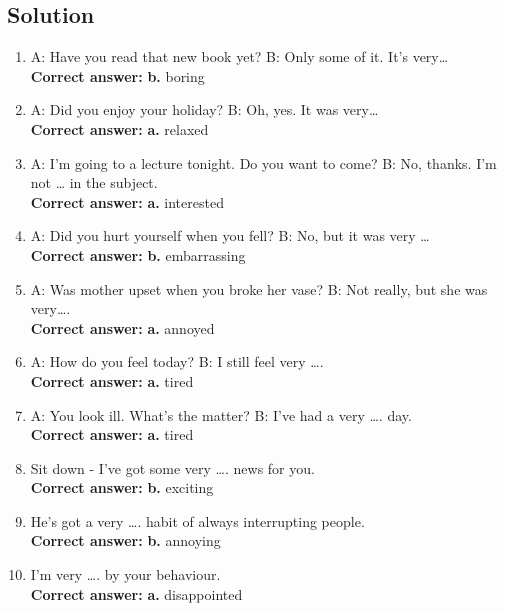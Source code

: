 \subsection*{Solution}
\begin{enumerate}
      \item A: Have you read that new book yet? B: Only some of it. It’s very…\\
            \textbf{Correct answer:} \textbf{b.} boring

      \item A: Did you enjoy your holiday? B: Oh, yes. It was very…\\
            \textbf{Correct answer:} \textbf{a.} relaxed

      \item A: I'm going to a lecture tonight. Do you want to come? B: No, thanks. I'm not … in the subject.\\
            \textbf{Correct answer:} \textbf{a.} interested

      \item A: Did you hurt yourself when you fell? B: No, but it was very …\\
            \textbf{Correct answer:} \textbf{b.} embarrassing

      \item A: Was mother upset when you broke her vase? B: Not really, but she was very….\\
            \textbf{Correct answer:} \textbf{a.} annoyed

      \item A: How do you feel today? B: I still feel very ….\\
            \textbf{Correct answer:} \textbf{a.} tired

      \item A: You look ill. What’s the matter? B: I’ve had a very …. day.\\
            \textbf{Correct answer:} \textbf{a.} tired

      \item Sit down - I've got some very …. news for you.\\
            \textbf{Correct answer:} \textbf{b.} exciting

      \item He's got a very …. habit of always interrupting people.\\
            \textbf{Correct answer:} \textbf{b.} annoying

      \item I'm very …. by your behaviour.\\
            \textbf{Correct answer:} \textbf{a.} disappointed
\end{enumerate}


